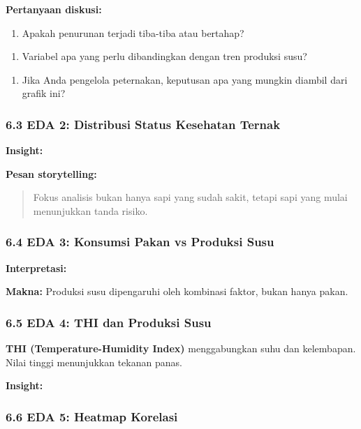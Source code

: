 \documentclass[12pt,a4paper]{article}
\begin{document}
\textbf{Pertanyaan diskusi:}

\begin{enumerate}
\item Apakah penurunan terjadi tiba-tiba atau bertahap?
\end{enumerate}

\begin{enumerate}
\item Variabel apa yang perlu dibandingkan dengan tren produksi susu?
\end{enumerate}

\begin{enumerate}
\item Jika Anda pengelola peternakan, keputusan apa yang mungkin diambil dari grafik ini?
\end{enumerate}


\subsubsection{6.3 EDA 2: Distribusi Status Kesehatan Ternak}

\textbf{Insight:}


\textbf{Pesan storytelling:}


\begin{quote}
Fokus analisis bukan hanya sapi yang sudah sakit, tetapi sapi yang mulai menunjukkan tanda risiko.\end{quote}


\subsubsection{6.4 EDA 3: Konsumsi Pakan vs Produksi Susu}

\textbf{Interpretasi:}


\textbf{Makna:} Produksi susu dipengaruhi oleh kombinasi faktor, bukan hanya pakan.


\subsubsection{6.5 EDA 4: THI dan Produksi Susu}

\textbf{THI (Temperature-Humidity Index)} menggabungkan suhu dan kelembapan. Nilai tinggi menunjukkan tekanan panas.


\textbf{Insight:}


\subsubsection{6.6 EDA 5: Heatmap Korelasi}
\end{document}
